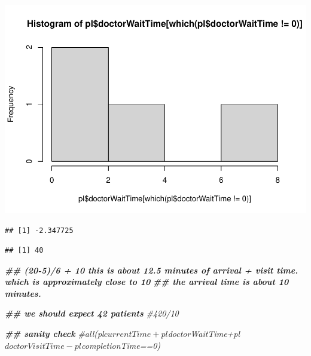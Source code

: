 \documentclass[
]{book}
\newenvironment{Shaded}{\begin{snugshade}}{\end{snugshade}}
\newcommand{\CommentTok}[1]{\textcolor[rgb]{0.56,0.35,0.01}{\textit{#1}}}
\newcommand{\DecValTok}[1]{\textcolor[rgb]{0.00,0.00,0.81}{#1}}
\newcommand{\DocumentationTok}[1]{\textcolor[rgb]{0.56,0.35,0.01}{\textbf{\textit{#1}}}}
\newcommand{\FunctionTok}[1]{\textcolor[rgb]{0.00,0.00,0.00}{#1}}
\newcommand{\NormalTok}[1]{#1}
\newcommand{\SpecialCharTok}[1]{\textcolor[rgb]{0.00,0.00,0.00}{#1}}
\theoremstyle{definition}
\theoremstyle{definition}
\theoremstyle{definition}
\theoremstyle{definition}
\theoremstyle{remark}
\begin{document}
\includegraphics{_main_files/figure-latex/unnamed-chunk-9-3.pdf}

\begin{Shaded}
\end{Shaded}

\begin{verbatim}
## [1] -2.347725
\end{verbatim}

\begin{Shaded}
\end{Shaded}

\begin{verbatim}
## [1] 40
\end{verbatim}

\begin{Shaded}
\begin{Highlighting}[]
\DocumentationTok{\#\# (20{-}5)/6 + 10 this is about 12.5 minutes of arrival + visit time. which is approximately close to 10 }
\DocumentationTok{\#\# the arrival time is about 10 minutes.  }

\DocumentationTok{\#\# we should expect 42 patients}
 \CommentTok{\#420/10}
  
  \DocumentationTok{\#\# sanity check}
  \CommentTok{\#all(pl$currentTime+pl$doctorWaitTime+pl$doctorVisitTime{-}pl$completionTime==0)}
\end{Highlighting}
\end{Shaded}
\end{document}

